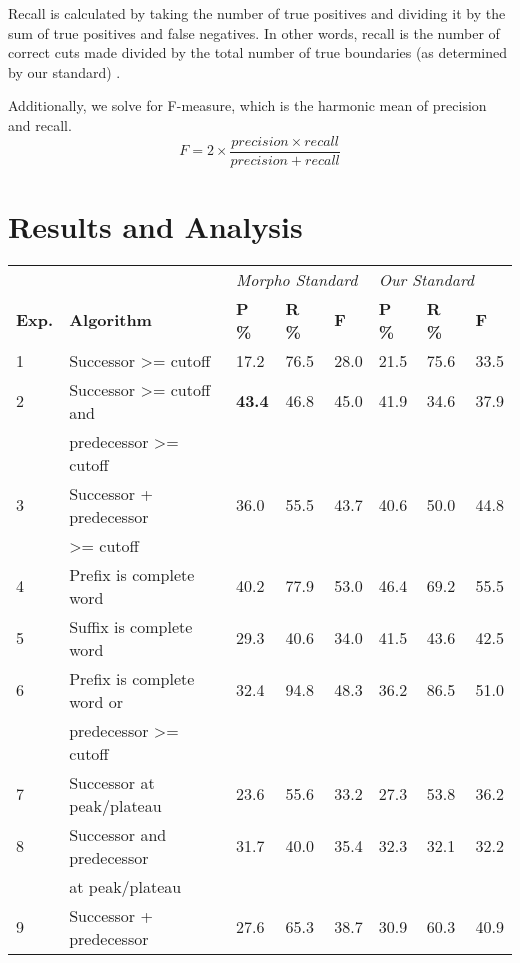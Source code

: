 \documentclass[11pt,letterpaper]{article}
\begin{document}
Recall is calculated by taking the number of true positives and dividing it by the sum of true positives and false negatives. In other words, recall is the number of correct cuts made divided by the total number of true boundaries (as determined by our standard) \cite{hafer1974-word}.

Additionally, we solve for F-measure, which is the harmonic mean of precision and recall. 
$$F = 2\times \frac{precision\times recall}{precision + recall}$$
\section{Results and Analysis}

\begin{table*}[t]
\centering
\begin{tabular}{|l|l|l|l|l|l|l|l|}
\hline
 &  & \multicolumn{3}{l|}{\textit{Morpho Standard}} & \multicolumn{3}{l|}{\textit{Our Standard}} \\ \cline{3-8} 
\textbf{Exp.} & \textbf{Algorithm} & \textbf{P \%} & \textbf{R \%} & \textbf{F} & \textbf{P \%} & \textbf{R \%} & \textbf{F} \\ \hline
1 & Successor \textgreater= cutoff & 17.2 & 76.5 & 28.0 & 21.5 & 75.6 & 33.5 \\
2 & Successor \textgreater= cutoff and & \textbf{43.4} & 46.8 & 45.0 & 41.9 & 34.6 & 37.9 \\
 & predecessor \textgreater= cutoff &  &  &  &  &  &  \\
3 & Successor + predecessor & 36.0 & 55.5 & 43.7 & 40.6 & 50.0 & 44.8 \\
 & \textgreater= cutoff &  &  &  &  &  &  \\
4 & Prefix is complete word & 40.2 & 77.9 & 53.0 & 46.4 & 69.2 & 55.5 \\
5 & Suffix is complete word & 29.3 & 40.6 & 34.0 & 41.5 & 43.6 & 42.5 \\
6 & Prefix is complete word or & 32.4 & 94.8 & 48.3 & 36.2 & 86.5 & 51.0 \\
 & predecessor \textgreater= cutoff &  &  &  &  &  &  \\
7 & Successor at peak/plateau & 23.6 & 55.6 & 33.2 & 27.3 & 53.8 & 36.2 \\
8 & Successor and predecessor & 31.7 & 40.0 & 35.4 & 32.3 & 32.1 & 32.2 \\
 & at peak/plateau &  &  &  &  &  &  \\
9 & Successor + predecessor & 27.6 & 65.3 & 38.7 & 30.9 & 60.3 & 40.9 \\

\end{tabular}
\end{table*}
\end{document}
